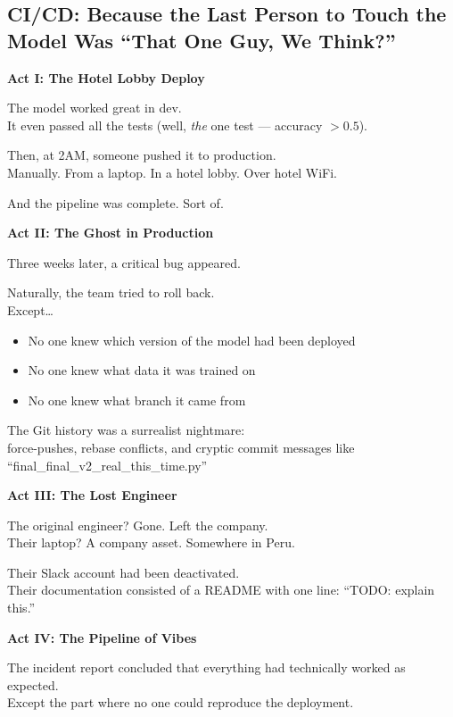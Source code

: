 \subsection{CI/CD: Because the Last Person to Touch the Model Was ``That One Guy, We Think?''}

\textbf{Act I: The Hotel Lobby Deploy}

The model worked great in dev.\\
It even passed all the tests (well, \textit{the} one test --- accuracy $> 0.5$).

Then, at 2AM, someone pushed it to production.\\
Manually. From a laptop. In a hotel lobby. Over hotel WiFi.

And the pipeline was complete. Sort of.

\vspace{1em}
\textbf{Act II: The Ghost in Production}

Three weeks later, a critical bug appeared.

Naturally, the team tried to roll back.\\
Except\ldots
\begin{itemize}
    \item No one knew which version of the model had been deployed
    \item No one knew what data it was trained on
    \item No one knew what branch it came from
\end{itemize}

The Git history was a surrealist nightmare: \\
force-pushes, rebase conflicts, and cryptic commit messages like ``final\_final\_v2\_real\_this\_time.py''

\vspace{1em}
\textbf{Act III: The Lost Engineer}

The original engineer? Gone. Left the company.\\
Their laptop? A company asset. Somewhere in Peru.

Their Slack account had been deactivated.\\
Their documentation consisted of a README with one line: ``TODO: explain this.''

\vspace{1em}
\textbf{Act IV: The Pipeline of Vibes}

The incident report concluded that everything had technically worked as expected.\\
Except the part where no one could reproduce the deployment.

